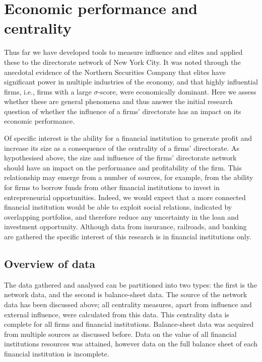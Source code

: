 \section{Economic performance and centrality} \label{Application:Regression}

Thus far we have developed tools to measure influence and elites and applied these to the directorate network of New York City. It was noted through the anecdotal evidence of the Northern Securities Company that elites have significant power in multiple industries of the economy, and that highly influential firms, i.e., firms with a large $\sigma$-score, were economically dominant. Here we assess whether these are general phenomena and thus answer the initial research question of whether the influence of a firms' directorate has an impact on its economic performance.

Of specific interest is the ability for a financial institution to generate profit and increase its size as a consequence of the centrality of a firms' directorate. As hypothesised above, the size and influence of the firms' directorate network should have an impact on the performance and profitability of the firm. This relationship may emerge from a number of sources, for example, from the ability for firms to borrow funds from other financial institutions to invest in entrepreneurial opportunities. Indeed, we would expect that a more connected financial institution would be able to exploit social relations, indicated by overlapping portfolios, and therefore reduce any uncertainty in the loan and investment opportunity. Although data from insurance, railroads, and banking are gathered the specific interest of this research is in financial institutions only.

\subsection{Overview of data}

The data gathered and analysed can be partitioned into two types: the first is the network data, and the second is balance-sheet data. The source of the network data has been discussed above; all centrality measures, apart from influence and external influence, were calculated from this data. This centrality data is complete for all firms and financial institutions. Balance-sheet data was acquired from multiple sources as discussed before. Data on the value of all financial institutions resources was attained, however data on the full balance sheet of each financial institution is incomplete.

